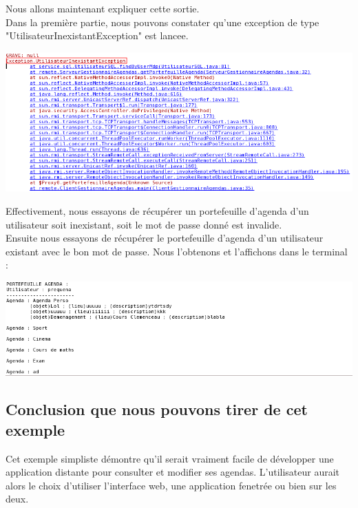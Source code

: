 \documentclass[12pt , a4paper]{article}
\begin{document}
\noindent Nous allons maintenant expliquer cette sortie.\\
Dans la première partie, nous pouvons constater qu'une exception de type "UtilisateurInexistantException" est lancee.
\begin{center}
  \includegraphics[scale=0.5]{./images/rmi-sortie01.png}
\end{center}
Effectivement, nous essayons de récupérer un portefeuille d'agenda d'un utilisateur soit inexistant, soit le mot de passe donné est invalide.\\


\noindent Ensuite nous essayons de récupérer le portefeuille d'agenda d'un utilisateur existant avec le bon mot de passe. Nous l'obtenons et l'affichons dans le terminal :
\begin{center}
  \includegraphics[scale=0.5]{./images/rmi-sortie02.png}
\end{center}

\subsection{Conclusion que nous pouvons tirer de cet exemple}
\noindent Cet exemple simpliste démontre qu'il serait vraiment facile de développer une application distante pour consulter et modifier ses agendas. L'utilisateur aurait alors le choix d'utiliser
l'interface web, une application fenetrée ou bien sur les deux.

\newpage	
\end{document}
